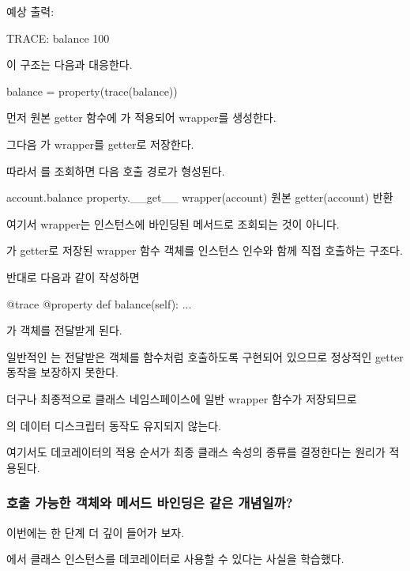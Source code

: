 예상 출력:

\begin{dhkzsh}
TRACE: balance
100
\end{dhkzsh}

이 구조는 다음과 대응한다.

\begin{dhkcode}
balance = property(trace(balance))
\end{dhkcode}

먼저 원본 getter 함수에 가 적용되어 wrapper를 생성한다.

그다음 가 wrapper를 getter로 저장한다.

따라서 를 조회하면 다음 호출 경로가 형성된다.

\begin{dhksmry}[centered]
account.balance
\da
property.__get__
\da
wrapper(account)
\da
원본 getter(account)
 반환
\end{dhksmry}

여기서 wrapper는 인스턴스에 바인딩된 메서드로 조회되는 것이 아니다.

가 getter로 저장된 wrapper 함수 객체를 인스턴스 인수와 함께 직접 호출하는 구조다.

반대로 다음과 같이 작성하면

\begin{dhkcode}
@trace
@property
def balance(self):
    ...
\end{dhkcode}

가  객체를 전달받게 된다.

일반적인 는 전달받은 객체를 함수처럼 호출하도록 구현되어 있으므로 정상적인 getter 동작을 보장하지 못한다.

더구나 최종적으로 클래스 네임스페이스에 일반 wrapper 함수가 저장되므로

의 데이터 디스크립터 동작도 유지되지 않는다.

여기서도 데코레이터의 적용 순서가 최종 클래스 속성의 종류를 결정한다는 원리가 적용된다.

\subsubsection{호출 가능한 객체와 메서드 바인딩은 같은 개념일까?}

이번에는 한 단계 더 깊이 들어가 보자.

에서 클래스 인스턴스를 데코레이터로 사용할 수 있다는 사실을 학습했다.

